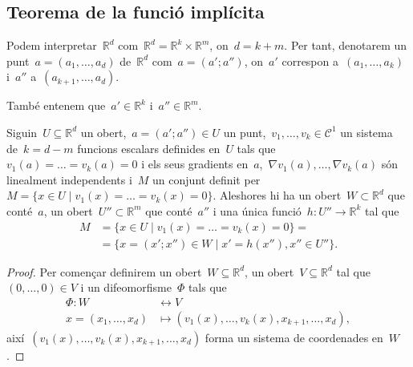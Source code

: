 \documentclass[../../main.tex]{subfiles}
\begin{document}
    \subsection{Teorema de la funció implícita}
    \begin{notation}
        \label{notation:punts per grups}
        Podem interpretar~\(\mathbb{R}^{d}\) com~\(\mathbb{R}^{d}=\mathbb{R}^{k}\times\mathbb{R}^{m}\), on~\(d=k+m\).
        Per tant, denotarem un punt~\(a=(a_{1},\dots,a_{d})\) de~\(\mathbb{R}^{d}\) com~\(a=(a';a'')\), on~\(a'\) correspon a~\((a_{1},\dots,a_{k})\) i~\(a''\) a~\((a_{k+1},\dots,a_{d})\).%

        També entenem que~\(a'\in\mathbb{R}^{k}\) i~\(a''\in\mathbb{R}^{m}\).
    \end{notation}
    \begin{theorem}
        \label{thm:Funció implícita}
        Siguin~\(U\subseteq\mathbb{R}^{d}\) un obert,~\(a=(a';a'')\in U\) un punt,~\(v_{1},\dots,v_{k}\in\mathcal{C}^{1}\) un sistema de~\(k=d-m\) funcions escalars definides en~\(U\) tals que~\(v_{1}(a)=\dots=v_{k}(a)=0\) i els seus gradients en~\(a\),~\(\nabla v_{1}(a),\dots,\nabla v_{k}(a)\) són linealment independents i~\(M\) un conjunt definit per~\(M=\{x\in U\mid v_{1}(x)=\dots=v_{k}(x)=0\}\).
        Aleshores hi ha un obert~\(W\subset\mathbb{R}^{d}\) que conté~\(a\), un obert~\(U''\subset\mathbb{R}^{m}\) que conté~\(a''\) i una única funció~\(h\colon U''\to\mathbb{R}^{k}\) tal que
        \begin{align*}
        M&=\{x\in U\mid v_{1}(x)=\dots=v_{k}(x)=0\}=\\
        &=\{x=(x';x'')\in W\mid x'=h(x''),x''\in U''\}.
        \end{align*}
        \begin{proof}%
            Per començar definirem un obert~\(W\subseteq\mathbb{R}^{d}\), un obert~\(V\subseteq\mathbb{R}^{d}\) tal que~\((0,\dots,0)\in V\) i un difeomorfisme~\(\Phi\) tals que
            \begin{align*}
            \Phi\colon W&\longleftrightarrow V\\
            x=(x_{1},\dots,x_{d})&\longmapsto(v_{1}(x),\dots,v_{k}(x),x_{k+1},\dots,x_{d}),
            \end{align*}
            així~\((v_{1}(x),\dots,v_{k}(x),x_{k+1},\dots,x_{d})\) forma un sistema de coordenades en~\(W\).


\end{proof}
\end{theorem}
\end{document}
